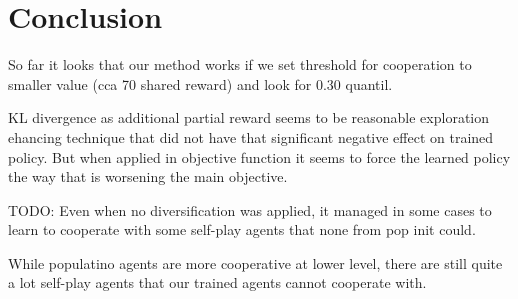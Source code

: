 \chapter*{Conclusion}
So far it looks that our method works if we set threshold for cooperation to smaller value (cca 70 shared reward) and look for 0.30 quantil.

KL divergence as additional partial reward seems to be reasonable exploration ehancing technique that did not have that significant negative effect on trained policy.
But when applied in objective function it seems to force the learned policy the way that is worsening the main objective.

TODO: Even when no diversification was applied, it managed in some cases to learn to cooperate with some self-play agents that none from pop init could.

While populatino agents are more cooperative at lower level, there are still quite a lot self-play agents that our trained agents cannot cooperate with.

